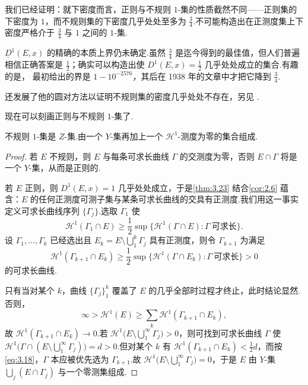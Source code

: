 我们已经证明：就下密度而言，正则与不规则 $1$-集的性质截然不同——正则集的下密度为 $1$，而不规则集的下密度几乎处处至多为 $\frac{3}{4}$.不可能构造出在正测度集上下密度严格介于 $\frac{3}{4}$ 与 $1$ 之间的 $1$-集.

$\underline{D}^1(E,x)$ 的精确的本质上界仍未确定.虽然 $\frac{3}{4}$ 是迄今得到的最佳值，但人们普遍相信正确答案是 $\frac{1}{2}$；确实可以构造出使 $D^1(E,x)=\frac{1}{2}$ 几乎处处成立的集合.有趣的是，\textcite{besicovitch1928a} 最初给出的界是 $1-10^{-2576}$，其后在 1938 年的文章中才把它降到 $\frac{3}{4}$.

\textcite{besicovitch1938} 还发展了他的圆对方法以证明不规则集的密度几乎处处不存在，另见 \textcites{besicovitchwalker1931,gillis1934b,morserandolph1944}.

现在可以刻画正则与不规则 $1$-集了.

\begin{theorem}\label{thm:3.25}
不规则 $1$-集是 $Z$-集.由一个 $Y$-集再加上一个 $\mathcal{H}^1$-测度为零的集合组成.
\end{theorem}

\begin{proof}
若 $E$ 不规则，则 $E$ 与每条可求长曲线 $\Gamma$ 的交测度为零，否则 $E\cap\Gamma$ 将是一个 $Y$-集，从而是正则的.

若 $E$ 正则，则 $D^1(E,x)=1$ 几乎处处成立，于是\cref{thm:3.23} 结合\cref{cor:2.6} 蕴含：$E$ 的任何正测度可测子集与某条可求长曲线的交具有正测度.我们用这一事实定义可求长曲线序列 $\{\Gamma_j\}$.选取 $\Gamma_1$ 使
\[
  \mathcal{H}^{1}(\Gamma_1\cap E)\geq\frac{1}{2}\sup\bigl\{\mathcal{H}^{1}(\Gamma\cap E):\Gamma\ \text{可求长}\bigr\}.
\]
设 $\Gamma_1,\ldots,\Gamma_k$ 已经选出且 $E_k=E\setminus\bigcup_{1}^{k}\Gamma_j$ 具有正测度，则令 $\Gamma_{k+1}$ 为满足
\begin{equation}\label{eq:3.18}
  \mathcal{H}^{1}(\Gamma_{k+1}\cap E_k)\geq\frac{1}{2}\sup\bigl\{\mathcal{H}^{1}(\Gamma\cap E_k):\Gamma\ \text{可求长}\bigr\}>0
\end{equation}
的可求长曲线.

只有当对某个 $k$，曲线 $\{\Gamma_j\}_{1}^{k}$ 覆盖了 $E$ 的几乎全部时过程才终止，此时结论显然.否则，
\[
  \infty>\mathcal{H}^{1}(E)\geq\sum_{k}\mathcal{H}^{1}(\Gamma_{k+1}\cap E_k),
\]
故 $\mathcal{H}^1(\Gamma_{k+1}\cap E_k)\to 0$.若 $\mathcal{H}^1\bigl(E\setminus\bigcup_{1}^{\infty}\Gamma_j\bigr)>0$，则可找到可求长曲线 $\Gamma$ 使 $\mathcal{H}^1\bigl(\Gamma\cap(E\setminus\bigcup_{1}^{\infty}\Gamma_j)\bigr)=d>0$.但对某个 $k$ 有 $\mathcal{H}^1(\Gamma_{k+1}\cap E_k)<\frac{1}{2}d$，而按 \eqref{eq:3.18}，$\Gamma$ 本应被优先选为 $\Gamma_{k+1}$.故 $\mathcal{H}^1\bigl(E\setminus\bigcup_{1}^{\infty}\Gamma_j\bigr)=0$，于是 $E$ 由 $Y$-集 $\bigcup_{j}(E\cap\Gamma_j)$ 与一个零测集组成.
\end{proof}

